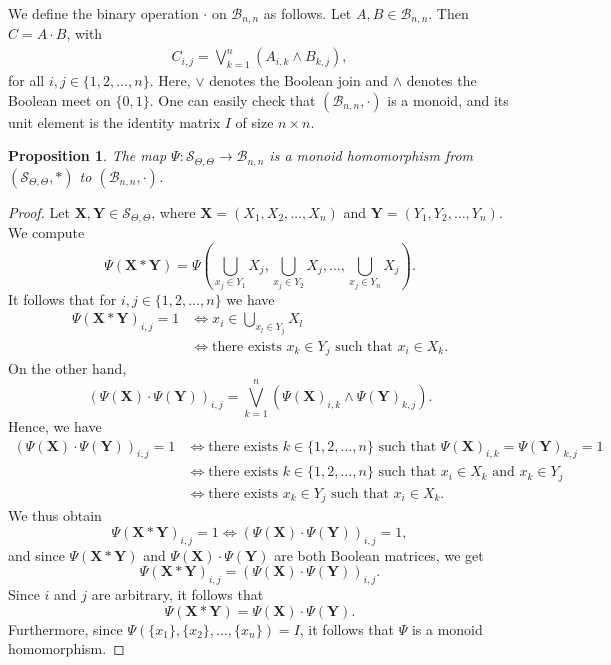 \documentclass[pdflatex,sn-mathphys-num]{sn-jnl}
\newtheorem{proposition}[theorem]{Proposition}
\theoremstyle{definition}
\theoremstyle{remark}
\begin{document}
We define the binary operation $\cdot$ on $\mathcal{B}_{n, n}$ as follows. 
Let $A, B \in \mathcal{B}_{n, n}$.
Then $C = A \cdot B$, with
\begin{align*}
   C_{i, j} = \bigvee_{k=1}^n (A_{i, k} \land B_{k, j}),
\end{align*}
for all $i, j \in \{1, 2, \dots, n\}$.
Here, $\lor$ denotes the Boolean join and $\land$ denotes the Boolean meet on $\{0, 1\}$.
One can easily check that $(\mathcal{B}_{n, n}, \cdot)$ is a monoid, and its unit element is the identity matrix $I$ of size $n \times n$.

\begin{proposition}\label{psi:homo}
   The map $\Psi : \mathcal{S}_{\Theta, \Theta} \to \mathcal{B}_{n, n}$ is a monoid homomorphism from $(\mathcal{S}_{\Theta, \Theta}, \ast)$ to $(\mathcal{B}_{n, n}, \cdot)$.
\end{proposition}

\begin{proof}
   Let $\mathbf{X}, \mathbf{Y} \in \mathcal{S}_{\Theta, \Theta}$, where $\mathbf{X} = (X_1, X_2, \dots, X_n)$ and $\mathbf{Y} = (Y_1, Y_2, \dots, Y_n)$.
   We compute
   \[
   \Psi(\mathbf{X} \ast \mathbf{Y}) = \Psi(\bigcup_{x_j \in Y_1} X_j, \bigcup_{x_j \in Y_2} X_j, \dots, \bigcup_{x_j \in Y_n} X_j).
   \]
   It follows that for $i, j \in \{1, 2, \dots, n\}$ we have 
   \begin{align*}
      \Psi(\mathbf{X} \ast \mathbf{Y})_{i, j} = 1 &\iff x_i \in \bigcup_{x_l \in Y_j} X_l \\
      &\iff \text{there exists } x_k \in Y_j \text{ such that } x_i \in X_k.
   \end{align*}
   On the other hand,
   \[
   (\Psi(\mathbf{X}) \cdot \Psi(\mathbf{Y}))_{i, j} = \bigvee_{k=1}^n (\Psi(\mathbf{X})_{i, k} \land \Psi(\mathbf{Y})_{k, j}).
   \]
   Hence, we have
   \begin{align*}
      (\Psi(\mathbf{X}) \cdot \Psi(\mathbf{Y}))_{i, j} = 1 &\iff \text{there exists } k \in \{1, 2, \dots, n\} \text{ such that } \Psi(\mathbf{X})_{i, k} = \Psi(\mathbf{Y})_{k, j} = 1 \\
      &\iff \text{there exists } k \in \{1, 2, \dots, n\} \text{ such that } x_i \in X_k \text{ and } x_k \in Y_j \\
      &\iff \text{there exists } x_k \in Y_j \text{ such that } x_i \in X_k.
   \end{align*}
   We thus obtain
   \[
   \Psi(\mathbf{X} \ast \mathbf{Y})_{i, j} = 1 \iff (\Psi(\mathbf{X}) \cdot \Psi(\mathbf{Y}))_{i, j} = 1,
   \]
   and since $\Psi(\mathbf{X} \ast \mathbf{Y})$ and $\Psi(\mathbf{X}) \cdot \Psi(\mathbf{Y})$ are both Boolean matrices, we get
   \[
   \Psi(\mathbf{X} \ast \mathbf{Y})_{i, j} = (\Psi(\mathbf{X}) \cdot \Psi(\mathbf{Y}))_{i, j}.
   \]
   Since $i$ and $j$ are arbitrary, it follows that
   \[
   \Psi(\mathbf{X} \ast \mathbf{Y}) = \Psi(\mathbf{X}) \cdot \Psi(\mathbf{Y}).
   \]
   Furthermore, since $\Psi(\{x_1\}, \{x_2\}, \dots, \{x_n\}) = I$, it follows that $\Psi$ is a monoid homomorphism.
\end{proof}
\end{document}
